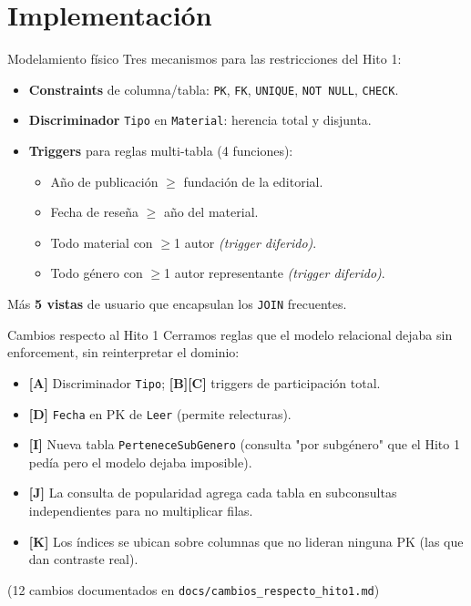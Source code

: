 \documentclass[10pt,aspectratio=169]{beamer}
\begin{document}
\section{Implementación}
\begin{frame}{Modelamiento físico}
Tres mecanismos para las restricciones del Hito 1:
\begin{itemize}
  \item \textbf{Constraints} de columna/tabla: \texttt{PK}, \texttt{FK}, \texttt{UNIQUE}, \texttt{NOT NULL}, \texttt{CHECK}.
  \item \textbf{Discriminador} \texttt{Tipo} en \texttt{Material}: herencia total y disjunta.
  \item \textbf{Triggers} para reglas multi-tabla (4 funciones):
  \begin{itemize}\footnotesize
    \item Año de publicación $\geq$ fundación de la editorial.
    \item Fecha de reseña $\geq$ año del material.
    \item Todo material con $\geq$1 autor \emph{(trigger diferido)}.
    \item Todo género con $\geq$1 autor representante \emph{(trigger diferido)}.
  \end{itemize}
\end{itemize}
\vspace{0.2cm}
Más \textbf{5 vistas} de usuario que encapsulan los \texttt{JOIN} frecuentes.
\end{frame}

\begin{frame}{Cambios respecto al Hito 1}
\footnotesize
Cerramos reglas que el modelo relacional dejaba sin enforcement, sin reinterpretar el dominio:
\begin{itemize}
  \item \textbf{[A]} Discriminador \texttt{Tipo}; \textbf{[B][C]} triggers de participación total.
  \item \textbf{[D]} \texttt{Fecha} en PK de \texttt{Leer} (permite relecturas).
  \item \textbf{[I]} Nueva tabla \texttt{PerteneceSubGenero} (consulta "por subgénero" que el Hito 1 pedía pero el modelo dejaba imposible).
  \item \textbf{[J]} La consulta de popularidad agrega cada tabla en subconsultas independientes para no multiplicar filas.
  \item \textbf{[K]} Los índices se ubican sobre columnas que no lideran ninguna PK (las que dan contraste real).
\end{itemize}
\centering (12 cambios documentados en \texttt{docs/cambios\_respecto\_hito1.md})
\end{frame}
\end{document}
